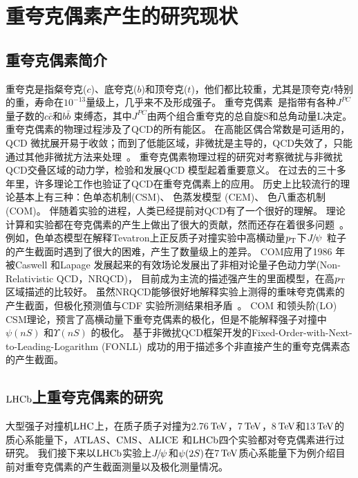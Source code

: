 \section{重夸克偶素产生的研究现状}
\subsection{重夸克偶素简介}

重夸克是指粲夸克($c$)、底夸克($b$)和顶夸克($t$)，他们都比较重，尤其是顶夸克$t$特别的重，寿命在$10^{-13}$量级上，几乎来不及形成强子。
重夸克偶素~\cite{Lansberg:2008gk}是指带有各种$J^{PC}$ 量子数的$c\bar{c}$和$b\bar{b}$ 束缚态，其中$J^{PC}$由两个组合重夸克的总自旋S和总角动量L决定。
重夸克偶素的物理过程涉及了QCD的所有能区。
在高能区偶合常数是可适用的，QCD 微扰展开易于收敛；而到了低能区域，非微扰是主导的，QCD失效了，只能通过其他非微扰方法来处理~\cite{Kramer:2001hh}。
重夸克偶素物理过程的研究对考察微扰与非微扰QCD交叠区域的动力学，检验和发展QCD 模型起着重要意义。
在过去的三十多年里，许多理论工作也验证了QCD在重夸克偶素上的应用。
历史上比较流行的理论基本上有三种：色单态机制(CSM)、 色蒸发模型 (CEM)、 色八重态机制(COM)。
伴随着实验的进程，人类已经提前对QCD有了一个很好的理解。
理论计算和实验都在夸克偶素的产生上做出了很大的贡献，然而还存在着很多问题~\cite{Brambilla:2010cs}。
例如，色单态模型在解释Tevatron上正反质子对撞实验中高横动量$\mbox{$p_{\mathrm{ T}}$}$下${{J\mskip -3mu/\mskip -2mu\psi\mskip 2mu}}$ 粒子的产生截面时遇到了很大的困难，产生了数量级上的差异。
COM应用了1986 年被Caswell 和Lapage 发展起来的有效场论发展出了非相对论量子色动力学(Non-Relativistic QCD，NRQCD)，
目前成为主流的描述强产生的里面模型，在高$\mbox{$p_{\mathrm{ T}}$}$区域描述的比较好。
虽然NRQCD能够很好地解释实验上测得的重味夸克偶素的产生截面，但极化预测值与CDF 实验所测结果相矛盾~\cite{Lansberg:2008gk}。
COM 和领头阶(LO) CSM理论，预言了高横动量下重夸克偶素的极化，但是不能解释强子对撞中$\psi(nS)$ 和$\Upsilon(nS)$ 的极化。
基于非微扰QCD框架开发的Fixed-Order-with-Next-to-Leading-Logarithm (FONLL)~\cite{Cacciari:1998it}成功的用于描述多个非直接产生的重夸克偶素态的产生截面。

\subsection{$\mbox{LHCb}$上重夸克偶素的研究}

大型强子对撞机$\mbox{LHC}$上，在质子质子对撞为2.76$\mathrm{\,Te\kern -0.1em V}$，7$\mathrm{\,Te\kern -0.1em V}$，8$\mathrm{\,Te\kern -0.1em V}$和13$\mathrm{\,Te\kern -0.1em V}$的质心系能量下，$\mbox{ATLAS}$、$\mbox{CMS}$、$\mbox{ALICE}$ 和$\mbox{LHCb}$四个实验都对夸克偶素进行过研究。
我们接下来以$\mbox{LHCb}$实验上${{J\mskip -3mu/\mskip -2mu\psi\mskip 2mu}}$和${\psi{(2S)}}$在7$\mathrm{\,Te\kern -0.1em V}$质心系能量下为例介绍目前对重夸克偶素的产生截面测量以及极化测量情况。


